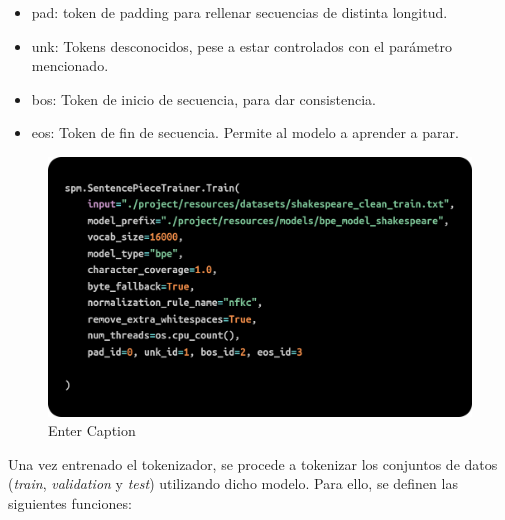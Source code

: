 \documentclass[11pt]{book}
\theoremstyle{plain}
\theoremstyle{definition}
\begin{document}
 \begin{itemize}
     \item pad: token de padding para rellenar secuencias de distinta longitud.
     \item unk: Tokens desconocidos, pese a estar controlados con el parámetro mencionado.
     \item bos: Token de inicio de secuencia, para dar consistencia.
     \item eos: Token de fin de secuencia. Permite al modelo a aprender a parar.
 \end{itemize}
\begin{figure}[h]
    \centering
    \includegraphics[width=0.5\linewidth]{img/sentence_trainer.png}
    \caption{Enter Caption}
    \label{fig:placeholder3}
\end{figure}
 
Una vez entrenado el tokenizador, se procede a tokenizar los conjuntos de datos (\textit{train}, \textit{validation} y \textit{test}) utilizando dicho modelo. Para ello, se definen las siguientes funciones:
\end{document}
